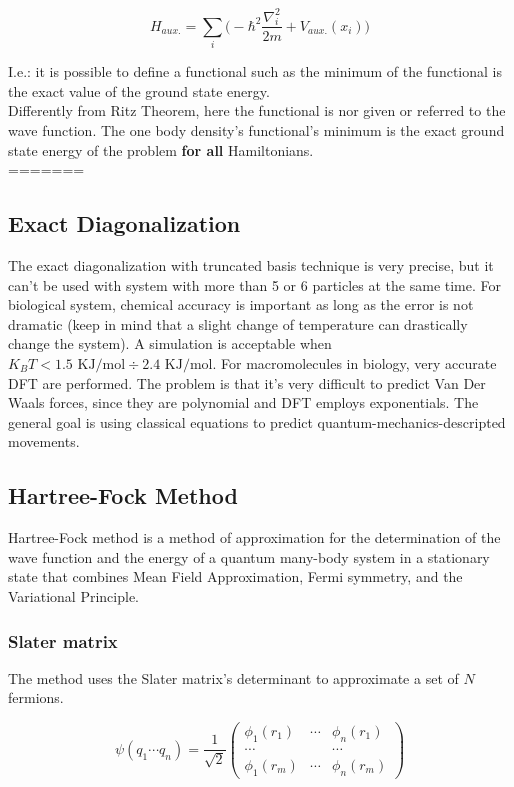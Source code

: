  \[
 H_{aux.} = \sum_i \bigg(-\hbar^2 \frac{\nabla_i^2}{2m} + V_{aux.}(x_i) \bigg)
 \]
 
I.e.: it is possible to define a functional such as the minimum of the functional is the exact value of the ground state energy. \\
Differently from Ritz Theorem, here the functional is nor given or referred to the wave function. 
The one body density's functional's minimum is the exact ground state energy of the problem \textbf{for all} Hamiltonians.\\
=======

	\subsection{Exact Diagonalization}
	The exact diagonalization with truncated basis technique is very precise, but it can't be used with system with more than 5 or 6 particles at the same time.
	For biological system, chemical accuracy is important as long as the error is not dramatic (keep in mind that a slight change of temperature can drastically change the system).
	A simulation is acceptable when $K_BT < 1.5\text{ KJ/mol} \div 2.4 \text{ KJ/mol}$.
	For macromolecules in biology, very accurate DFT are performed.
	The problem is that it's very difficult to predict Van Der Waals forces, since they are polynomial and DFT employs exponentials.
	The general goal is using classical equations to predict quantum-mechanics-descripted movements.

	\subsection{Hartree-Fock Method}
	Hartree-Fock method is a method of approximation for the determination of the wave function and the energy of a quantum many-body system in a stationary state that combines Mean Field Approximation, Fermi symmetry, and the Variational Principle.

		\subsubsection{Slater matrix}
		The method uses the Slater matrix's determinant to approximate a set of $N$ fermions.

		$$\psi(q_1\cdots q_n)=\frac{1}{\sqrt{2}}\begin{pmatrix}\phi_1(r_1)&\cdots&\phi_n(r_1)\\\cdots & &\cdots\\\phi_1(r_m)&\cdots&\phi_n(r_m)\end{pmatrix}$$

